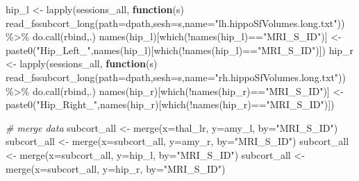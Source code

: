 \documentclass[
]{article}
\newenvironment{Shaded}{\begin{snugshade}}{\end{snugshade}}
\newcommand{\AttributeTok}[1]{\textcolor[rgb]{0.77,0.63,0.00}{#1}}
\newcommand{\CommentTok}[1]{\textcolor[rgb]{0.56,0.35,0.01}{\textit{#1}}}
\newcommand{\ControlFlowTok}[1]{\textcolor[rgb]{0.13,0.29,0.53}{\textbf{#1}}}
\newcommand{\FunctionTok}[1]{\textcolor[rgb]{0.00,0.00,0.00}{#1}}
\newcommand{\NormalTok}[1]{#1}
\newcommand{\OtherTok}[1]{\textcolor[rgb]{0.56,0.35,0.01}{#1}}
\newcommand{\SpecialCharTok}[1]{\textcolor[rgb]{0.00,0.00,0.00}{#1}}
\newcommand{\StringTok}[1]{\textcolor[rgb]{0.31,0.60,0.02}{#1}}
\begin{document}
\begin{Shaded}
\begin{Highlighting}[]
\NormalTok{hip\_l }\OtherTok{\textless{}{-}} \FunctionTok{lapply}\NormalTok{(sessions\_all, }\ControlFlowTok{function}\NormalTok{(s) }\FunctionTok{read\_fssubcort\_long}\NormalTok{(}\AttributeTok{path=}\NormalTok{dpath,}\AttributeTok{sesh=}\NormalTok{s,}\AttributeTok{name=}\StringTok{"lh.hippoSfVolumes.long.txt"}\NormalTok{)) }\SpecialCharTok{\%\textgreater{}\%} \FunctionTok{do.call}\NormalTok{(rbind,.)}
\FunctionTok{names}\NormalTok{(hip\_l)[}\FunctionTok{which}\NormalTok{(}\SpecialCharTok{!}\FunctionTok{names}\NormalTok{(hip\_l)}\SpecialCharTok{==}\StringTok{"MRI\_S\_ID"}\NormalTok{)] }\OtherTok{\textless{}{-}} \FunctionTok{paste0}\NormalTok{(}\StringTok{"Hip\_Left\_"}\NormalTok{,}\FunctionTok{names}\NormalTok{(hip\_l)[}\FunctionTok{which}\NormalTok{(}\SpecialCharTok{!}\FunctionTok{names}\NormalTok{(hip\_l)}\SpecialCharTok{==}\StringTok{"MRI\_S\_ID"}\NormalTok{)])}
\NormalTok{hip\_r }\OtherTok{\textless{}{-}} \FunctionTok{lapply}\NormalTok{(sessions\_all, }\ControlFlowTok{function}\NormalTok{(s) }\FunctionTok{read\_fssubcort\_long}\NormalTok{(}\AttributeTok{path=}\NormalTok{dpath,}\AttributeTok{sesh=}\NormalTok{s,}\AttributeTok{name=}\StringTok{"rh.hippoSfVolumes.long.txt"}\NormalTok{)) }\SpecialCharTok{\%\textgreater{}\%} \FunctionTok{do.call}\NormalTok{(rbind,.)}
\FunctionTok{names}\NormalTok{(hip\_r)[}\FunctionTok{which}\NormalTok{(}\SpecialCharTok{!}\FunctionTok{names}\NormalTok{(hip\_r)}\SpecialCharTok{==}\StringTok{"MRI\_S\_ID"}\NormalTok{)] }\OtherTok{\textless{}{-}} \FunctionTok{paste0}\NormalTok{(}\StringTok{"Hip\_Right\_"}\NormalTok{,}\FunctionTok{names}\NormalTok{(hip\_r)[}\FunctionTok{which}\NormalTok{(}\SpecialCharTok{!}\FunctionTok{names}\NormalTok{(hip\_r)}\SpecialCharTok{==}\StringTok{"MRI\_S\_ID"}\NormalTok{)])}

\CommentTok{\# merge data}
\NormalTok{subcort\_all }\OtherTok{\textless{}{-}} \FunctionTok{merge}\NormalTok{(}\AttributeTok{x=}\NormalTok{thal\_lr, }\AttributeTok{y=}\NormalTok{amy\_l, }\AttributeTok{by=}\StringTok{"MRI\_S\_ID"}\NormalTok{)}
\NormalTok{subcort\_all }\OtherTok{\textless{}{-}} \FunctionTok{merge}\NormalTok{(}\AttributeTok{x=}\NormalTok{subcort\_all, }\AttributeTok{y=}\NormalTok{amy\_r, }\AttributeTok{by=}\StringTok{"MRI\_S\_ID"}\NormalTok{)}
\NormalTok{subcort\_all }\OtherTok{\textless{}{-}} \FunctionTok{merge}\NormalTok{(}\AttributeTok{x=}\NormalTok{subcort\_all, }\AttributeTok{y=}\NormalTok{hip\_l, }\AttributeTok{by=}\StringTok{"MRI\_S\_ID"}\NormalTok{)}
\NormalTok{subcort\_all }\OtherTok{\textless{}{-}} \FunctionTok{merge}\NormalTok{(}\AttributeTok{x=}\NormalTok{subcort\_all, }\AttributeTok{y=}\NormalTok{hip\_r, }\AttributeTok{by=}\StringTok{"MRI\_S\_ID"}\NormalTok{)}


\end{Highlighting}
\end{Shaded}
\end{document}

